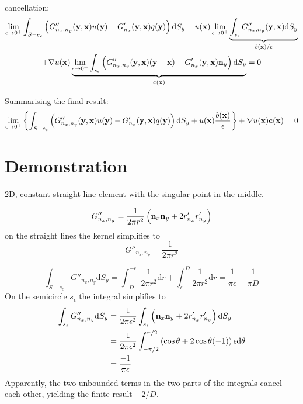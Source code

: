 \documentclass[a4paper,11pt]{article}
\newcommand{\td}{\mathrm{d}}
\begin{document}
%
cancellation:
%
\begin{multline}
\lim_{\epsilon \to 0^+}
\int_{S-e_{\epsilon}}
\left(
G''_{n_x,n_y}({\bf y}, {\bf x}) u({\bf y})
- G'_{n_x}({\bf y}, {\bf x}) q({\bf y})
\right)
\td S_y
+
u({\bf x})
\lim_{\epsilon \to 0^+}
\underbrace{
\int_{s_{\epsilon}}
G''_{n_x,n_y}({\bf y}, {\bf x}) 
\td S_y
}_{b({\bf x})/\epsilon}
\\
+
\nabla u({\bf x}) 
\underbrace{
\lim_{\epsilon \to 0^+}
\int_{s_{\epsilon}}
\left(
G''_{n_x,n_y}({\bf y}, {\bf x}) ({\bf y} - {\bf x})
- G'_{n_x}({\bf y}, {\bf x}) {\bf n}_y
\right)
\td S_y
}_{\bf c({\bf x})}
= 0
\end{multline}
%

Summarising the final result:
%
\begin{equation}
\lim_{\epsilon \to 0^+}
\left\{
\int_{S-e_{\epsilon}}
\left(
G''_{n_x,n_y}({\bf y}, {\bf x}) u({\bf y})
- G'_{n_x}({\bf y}, {\bf x}) q({\bf y})
\right)
\td S_y
+
u({\bf x})
\frac{b({\bf x})}{\epsilon}
\right\}
+
\nabla u({\bf x}) 
{\bf c}({\bf x})
= 0
\end{equation}


\section{Demonstration}


2D, constant straight line element with the singular point in the middle.

\begin{equation}
G''_{n_x, n_y} = \frac{1}{2\pi r^2} \left({\bf n}_x {\bf n}_y + 2 r'_{n_x} r'_{n_y}\right)
\end{equation}
%
on the straight lines the kernel simplifies to
%
\begin{equation}
G''_{n_x, n_y} = \frac{1}{2\pi r^2}
\end{equation}

\begin{equation}
\int_{S-e_{\epsilon}} G''_{n_x,n_y} \td S_y
=
\int_{-D}^{-\epsilon} \frac{1}{2\pi r^2} \td r + \int_{\epsilon}^{D} \frac{1}{2\pi r^2} \td r
=
\frac{1}{\pi \epsilon} - \frac{1}{\pi D}
\end{equation}
%
On the semicircle $s_{\epsilon}$ the integral simplifies to
%
\begin{align}
\int_{s_{\epsilon}} G''_{n_x,n_y} \td S_y
&=
\frac{1}{2\pi\epsilon^2}\int_{s_{\epsilon}} \left({\bf n}_x{\bf n}_y + 2 r'_{n_x} r'_{n_y}\right) \td S_y \nonumber \\
&=
\frac{1}{2\pi \epsilon^2} \int_{-\pi/2}^{\pi/2} \left(\cos\theta + 2 \cos\theta (-1)\right) \epsilon \td \theta \nonumber \\
&= \frac{-1}{\pi\epsilon}
\end{align}
%
Apparently, the two unbounded terms in the two parts of the integrals cancel each other, yielding the finite result $-2/D$.
\end{document}
